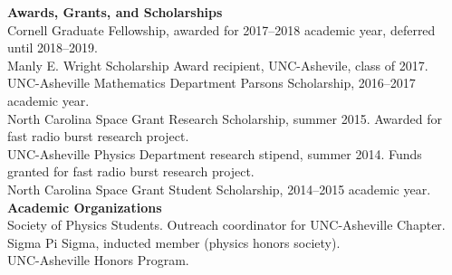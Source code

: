 \documentclass[a4paper, 11pt]{article}
\newcommand{\noi}{\noindent}
\begin{document}
\noi \textbf{Awards, Grants, and Scholarships}
\\

\noi Cornell Graduate Fellowship, awarded for 2017--2018 academic year, deferred until 2018--2019.
\\

\noi Manly E. Wright Scholarship Award recipient, UNC-Ashevile, class of 2017.
\\

\noi UNC-Asheville Mathematics Department Parsons Scholarship, 2016--2017 academic year.
\\

\noi North Carolina Space Grant Research Scholarship, summer 2015. Awarded for fast radio burst research project.
\\

\noi UNC-Asheville Physics Department research stipend, summer 2014. Funds granted for fast radio burst research project.
\\

\noi North Carolina Space Grant Student Scholarship, 2014--2015 academic year.
\\


\noi \textbf{Academic Organizations}
\\

\noi Society of Physics Students. Outreach coordinator for UNC-Asheville Chapter.
\\

\noi Sigma Pi Sigma, inducted member (physics honors society).
\\

\noi UNC-Asheville Honors Program.
\end{document}
